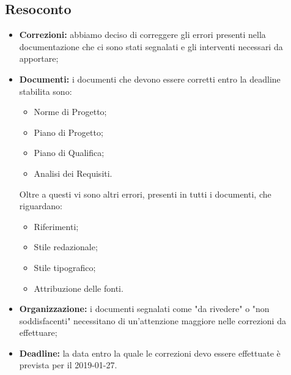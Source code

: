 \subsection{Resoconto}
\begin{itemize}
	\item { \textbf{Correzioni:} abbiamo deciso di correggere gli errori presenti nella documentazione che ci sono stati segnalati e gli interventi necessari da apportare;}
	\item{ \textbf{Documenti:} i documenti che devono essere corretti entro la deadline stabilita sono:
		\begin{itemize}
			\item Norme di Progetto;
			\item Piano di Progetto;
			\item Piano di Qualifica;
			\item Analisi dei Requisiti.
		\end{itemize}}
	Oltre a questi vi sono altri errori, presenti in tutti i documenti, che riguardano:
	\begin{itemize}
		\item Riferimenti;
		\item Stile redazionale;
		\item Stile tipografico;
		\item Attribuzione delle fonti.
	\end{itemize}
	\item { \textbf{Organizzazione:} i documenti segnalati come "da rivedere" o "non soddisfacenti" necessitano di un'attenzione maggiore nelle correzioni da effettuare; }
	\item { \textbf{Deadline:} la data entro la quale le correzioni devo essere effettuate è prevista per il 2019-01-27.}
\end{itemize}


